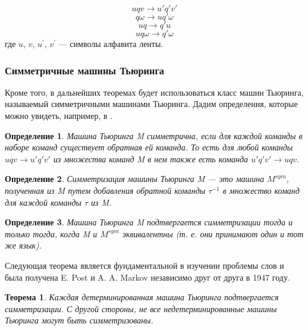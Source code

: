 \documentclass[14pt]{matmex-diploma-custom}
\newtheorem{thm}{Теорема}[subsection]
\newtheorem{defn}{Определение}[subsection]
\begin{document}
\begin{equation}
    u q v \to u' q' v' \label{eqreplace}
\end{equation}
\begin{equation}
    q \omega \to u q' \omega \label{eqinsert}
\end{equation}
\begin{equation}
    u q \to q' u \label{eqmove}
\end{equation}
\begin{equation}
    u q \omega \to q' \omega \label{eqdelete}
\end{equation}
где $u$, $v$, $u^{'}$, $v^{'}$ --- символы алфавита ленты. 

\subsubsection{Симметричные машины Тьюринга}

Кроме того, в дальнейших теоремах будет использоваться класс машин Тьюринга,
называемый симметричными машинами Тьюринга. Дадим определения, которые можно увидеть, 
например, в \cite{symTM}.

\begin{defn}
Машина Тьюринга M симметрична, если для каждой команды в наборе команд существует
обратная ей команда. То есть для любой команды $ u q v \to u' q' v'$ из множества команд 
M в нем также есть команда $ u' q' v' \to u q v $.
\end{defn}

\begin{defn}
Симметризация машины Тьюринга M --- это машина $M^{sym}$, полученная из M путем добавления обратной 
команды $\tau^{-1}$ в множество команд для каждой команды $\tau$ из M.
\end{defn}

\begin{defn}
Машина Тьюринга M подтвергается симметризации тогда и только тогда, 
когда M и $M^{sym}$ эквивалентны (т. е. они принимают один и тот же язык).
\end{defn}

Следующая теорема является фундаментальной в изучении проблемы слов и была получена 
E. Post и A. A. Markov независимо друг от друга в 1947 году.

\begin{thm} \label{symDetTm}
Каждая детерминированная машина Тьюринга подтвергается симметризации. 
С другой стороны, не все недетерминированные машины Тьюринга могут быть симметризованы.
\end{thm}
\end{document}
